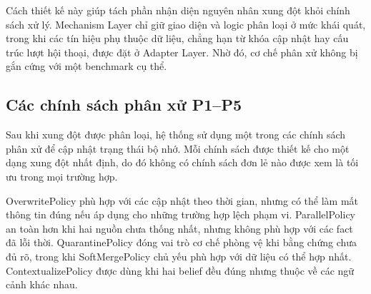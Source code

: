 \documentclass[12pt,a4paper]{article}
\begin{document}
Cách thiết kế này giúp tách phần nhận diện nguyên nhân xung đột khỏi chính sách xử lý. Mechanism Layer chỉ giữ giao diện và logic phân loại ở mức khái quát, trong khi các tín hiệu phụ thuộc dữ liệu, chẳng hạn từ khóa cập nhật hay cấu trúc lượt hội thoại, được đặt ở Adapter Layer. Nhờ đó, cơ chế phân xử không bị gắn cứng với một benchmark cụ thể.

\subsection{Các chính sách phân xử P1--P5}

Sau khi xung đột được phân loại, hệ thống sử dụng một trong các chính sách phân xử để cập nhật trạng thái bộ nhớ. Mỗi chính sách được thiết kế cho một dạng xung đột nhất định, do đó không có chính sách đơn lẻ nào được xem là tối ưu trong mọi trường hợp.

\begin{table}[H]
\centering
\caption{Các chính sách phân xử và phạm vi áp dụng.}
\label{tab:policies}
\end{table}

OverwritePolicy phù hợp với các cập nhật theo thời gian, nhưng có thể làm mất thông tin đúng nếu áp dụng cho những trường hợp lệch phạm vi. ParallelPolicy an toàn hơn khi hai nguồn chưa thống nhất, nhưng không phù hợp với các fact đã lỗi thời. QuarantinePolicy đóng vai trò cơ chế phòng vệ khi bằng chứng chưa đủ rõ, trong khi SoftMergePolicy chủ yếu phù hợp với dữ liệu có thể hợp nhất. ContextualizePolicy được dùng khi hai belief đều đúng nhưng thuộc về các ngữ cảnh khác nhau.
\end{document}
